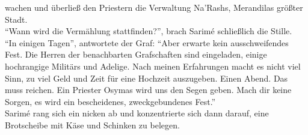 wachen und überließ den Priestern die Verwaltung Na'Rashs, Merandilas größter Stadt.\\
``Wann wird die Vermählung stattfinden?'', brach Sarimé schließlich die Stille. \\
``In einigen Tagen'', antwortete der Graf: ``Aber erwarte kein ausschweifendes Fest. Die Herren der 
benachbarten Grafschaften sind eingeladen, einige hochrangige Militärs und Adelige. Nach meinen 
Erfahrungen macht es nicht viel Sinn, zu viel Geld und Zeit für eine Hochzeit auszugeben. Einen 
Abend. Das muss reichen. Ein Priester Osymas wird uns den Segen geben. Mach dir keine Sorgen, es 
wird ein bescheidenes, zweckgebundenes Fest.''\\
Sarimé rang sich ein nicken ab und konzentrierte sich dann darauf, eine Brotscheibe mit Käse und 
Schinken zu belegen.\\

